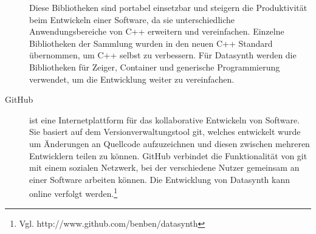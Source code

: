 \documentclass[a4paper, 
               12pt,
               DIV=calc,
               version=first,
               pdftex,
               headsepline,
               footsepline,
               bibtotocnumbered,
               liststotocnumbered]{scrreprt}
\begin{document}
\begin{description}
Diese Bibliotheken sind portabel einsetzbar und steigern die
Produktivität beim Entwickeln einer Software, da sie unterschiedliche
Anwendungsbereiche von C++ erweitern und vereinfachen.
Einzelne Bibliotheken der Sammlung wurden in den neuen C++ Standard
übernommen, um C++ selbst zu verbessern.
Für Datasynth werden die Bibliotheken für Zeiger, Container
und generische Programmierung verwendet, um die Entwicklung weiter zu vereinfachen.
\item[GitHub]
ist eine Internetplattform für das kollaborative Entwickeln von Software.
Sie basiert auf dem Versionverwaltungstool git, welches entwickelt wurde
um Änderungen an Quellcode aufzuzeichnen und diesen zwischen mehreren
Entwicklern teilen zu können. GitHub verbindet die Funktionalität von git mit
einem sozialen Netzwerk, bei der verschiedene Nutzer gemeinsam
an einer Software arbeiten können. Die Entwicklung von Datasynth kann online 
verfolgt werden.\footnote{Vgl. http://www.github.com/benben/datasynth}
\end{description}
\end{document}
